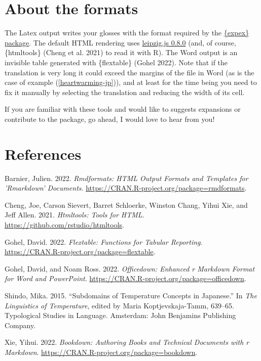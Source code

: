 \documentclass[
  letterpaper,
  DIV=11,
  numbers=noendperiod]{scrartcl}
\newlength{\cslhangindent}
\newlength{\cslentryspacingunit} %
\newenvironment{CSLReferences}[2] %
 {%
  \setlength{\parindent}{0pt}
  \ifodd #1
  \let\oldpar\par
  \def\par{\hangindent=\cslhangindent\oldpar}
  \fi
  \setlength{\parskip}{#2\cslentryspacingunit}
 }%
 {}
\begin{document}
\hypertarget{about-the-formats}{%
\section{About the formats}\label{about-the-formats}}

The Latex output writes your glosses with the format required by the
\href{https://ctan.org/pkg/expex?lang=en}{\{expex\} package}. The
default HTML rendering uses
\href{https://github.com/bdchauvette/leipzig.js/}{leipzig.js 0.8.0}
(and, of course, \{htmltools\} (Cheng et al. 2021) to read it with R).
The Word output is an invisible table generated with \{flextable\}
(Gohel 2022). Note that if the translation is very long it could exceed
the margins of the file in Word (as is the case of example
(\ref{heartwarming-jp})), and at least for the time being you need to
fix it manually by selecting the translation and reducing the width of
its cell.

If you are familiar with these tools and would like to suggests
expansions or contribute to the package, go ahead, I would love to hear
from you!

\hypertarget{references}{%
\section*{References}\label{references}}

\hypertarget{refs}{}
\begin{CSLReferences}{1}{0}
\leavevmode{}%
Barnier, Julien. 2022. \emph{Rmdformats: HTML Output Formats and
Templates for 'Rmarkdown' Documents}.
\url{https://CRAN.R-project.org/package=rmdformats}.

\leavevmode{}%
Cheng, Joe, Carson Sievert, Barret Schloerke, Winston Chang, Yihui Xie,
and Jeff Allen. 2021. \emph{Htmltools: Tools for HTML}.
\url{https://github.com/rstudio/htmltools}.

\leavevmode{}%
Gohel, David. 2022. \emph{Flextable: Functions for Tabular Reporting}.
\url{https://CRAN.R-project.org/package=flextable}.

\leavevmode{}%
Gohel, David, and Noam Ross. 2022. \emph{Officedown: Enhanced r Markdown
Format for Word and PowerPoint}.
\url{https://CRAN.R-project.org/package=officedown}.

\leavevmode{}%
Shindo, Mika. 2015. {``Subdomains of Temperature Concepts in
{Japanese}.''} In \emph{The {Linguistics} of {Temperature}}, edited by
Maria Koptjevskaja-Tamm, 639--65. Typological {Studies} in {Language}.
{Amsterdam}: {John Benjamins Publishing Company}.

\leavevmode{}%
Xie, Yihui. 2022. \emph{Bookdown: Authoring Books and Technical
Documents with r Markdown}.
\url{https://CRAN.R-project.org/package=bookdown}.

\end{CSLReferences}
\end{document}
